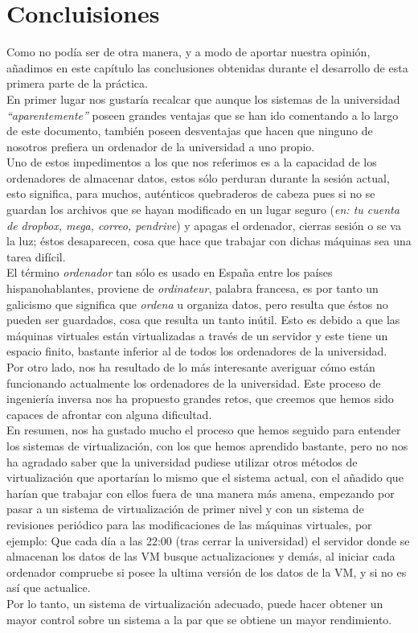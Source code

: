 \chapter{Concluisiones}
\lettrine[lines=1,slope=4pt,findent=0pt]{C}{}omo no podía ser de otra manera, y a modo de aportar nuestra opinión, añadimos en este capítulo las conclusiones obtenidas durante el desarrollo de esta primera parte de la práctica.\\

En primer lugar nos gustaría recalcar que aunque los sistemas de la universidad \emph{\textquotedblleft aparentemente\textquotedblright} poseen grandes ventajas que se han ido comentando a lo largo de este documento, también poseen desventajas que hacen que ninguno de nosotros prefiera un ordenador de la universidad a uno propio.\\

Uno de estos impedimentos a los que nos referimos es a la capacidad de los ordenadores de almacenar datos, estos sólo perduran durante la sesión actual, esto significa, para muchos, auténticos quebraderos de cabeza pues si no se guardan los archivos que se hayan modificado en un lugar seguro (\emph{en: tu cuenta de dropbox, mega, correo, pendrive}) y apagas el ordenador, cierras sesión o se va la luz; éstos desaparecen, cosa que hace que trabajar con dichas máquinas sea una tarea difícil.\\

El término \emph{ordenador} tan sólo es usado en España entre los países hispanohablantes, proviene de \emph{ordinateur}, palabra francesa, es por tanto un galicismo que significa que \emph{ordena} u organiza datos, pero resulta que éstos no pueden ser guardados, cosa que resulta un tanto inútil. Esto es debido a que las máquinas virtuales están virtualizadas a través de un servidor y este tiene un espacio finito, bastante inferior al de todos los ordenadores de la universidad.\\

Por otro lado, nos ha resultado de lo más interesante averiguar cómo están funcionando actualmente los ordenadores de la universidad. Este proceso de ingeniería inversa nos ha propuesto grandes retos, que creemos que hemos sido capaces de afrontar con alguna dificultad.\\

En resumen, nos ha gustado mucho el proceso que hemos seguido para entender los sistemas de virtualización, con los que hemos aprendido bastante, pero no nos ha agradado saber que la universidad pudiese utilizar otros métodos de virtualización que aportarían lo mismo que el sistema actual, con el añadido que harían que trabajar con ellos fuera de una manera más amena, empezando por pasar a un sistema de virtualización de primer nivel y con un sistema de revisiones periódico para las modificaciones de las máquinas virtuales, por ejemplo: Que cada día a las 22:00 (tras cerrar la universidad) el servidor donde se almacenan los datos de las VM busque actualizaciones y demás, al iniciar cada ordenador compruebe si posee la ultima versión de los datos de la VM, y si no es así que actualice.\\

Por lo tanto, un sistema de virtualización adecuado, puede hacer obtener un mayor control sobre un sistema a la par que se obtiene un mayor rendimiento.